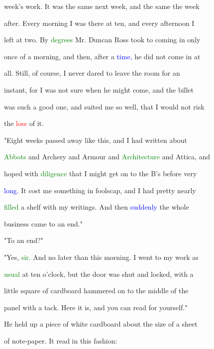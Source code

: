  week's work. It was the same next week, and the same the week

 after. Every morning I was there at ten, and every afternoon I

 left at two. By \textcolor{green}{degrees} Mr. Duncan Ross took to coming in only

 once of a morning, and then, after a \textcolor{blue}{time,} he did not come in at

 all. Still, of course, I never \textcolor{BurntOrange}{dared} to \textcolor{BurntOrange}{leave} the room for an

 instant, for I was not sure when he might come, and the billet

 was such a \textcolor{BurntOrange}{good} one, and suited me so well, that I would not \textcolor{BurntOrange}{risk}

 the \textcolor{red}{loss} of it.



 "Eight weeks passed away like this, and I had written about

 \textcolor{green}{Abbots} and Archery and Armour and \textcolor{green}{Architecture} and Attica, and

 hoped with \textcolor{green}{diligence} that I might get on to the B's before very

 \textcolor{blue}{long.} It cost me something in foolscap, and I had \textcolor{BurntOrange}{pretty} nearly

 \textcolor{green}{filled} a shelf with my writings. And then \textcolor{blue}{suddenly} the whole

 business came to an end."



 "To an end?"



 "Yes, \textcolor{green}{sir.} And no later than this morning. I went to my work as

 \textcolor{green}{usual} at ten o'clock, but the door was shut and locked, with a

 little square of cardboard hammered on to the middle of the

 panel with a tack. Here it is, and you can read for yourself."



 He held up a piece of \textcolor{BurntOrange}{white} cardboard about the size of a sheet

 of note-paper. It read in this fashion:



